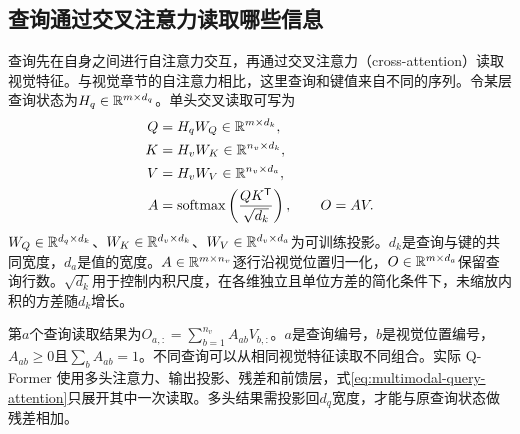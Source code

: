 \subsection{查询通过交叉注意力读取哪些信息}
查询先在自身之间进行自注意力交互，再通过交叉注意力（cross-attention）读取视觉特征。与视觉章节的自注意力相比，这里查询和键值来自不同的序列。令某层查询状态为$H_q\in\mathbb{R}^{m\times d_q}$。单头交叉读取可写为
\begin{align}
 Q&=H_qW_Q\in\mathbb{R}^{m\times d_k},\\
 K&=H_vW_K\in\mathbb{R}^{n_v\times d_k},\\
 V&=H_vW_V\in\mathbb{R}^{n_v\times d_a},\\
 A&=\operatorname{softmax}\left(\frac{QK^{\mathsf T}}{\sqrt{d_k}}\right),
 \qquad O=AV.
 \label{eq:multimodal-query-attention}
\end{align}
$W_Q\in\mathbb{R}^{d_q\times d_k}$、$W_K\in\mathbb{R}^{d_v\times d_k}$、$W_V\in\mathbb{R}^{d_v\times d_a}$为可训练投影。$d_k$是查询与键的共同宽度，$d_a$是值的宽度。$A\in\mathbb{R}^{m\times n_v}$逐行沿视觉位置归一化，$O\in\mathbb{R}^{m\times d_a}$保留查询行数。$\sqrt{d_k}$用于控制内积尺度，在各维独立且单位方差的简化条件下，未缩放内积的方差随$d_k$增长。

第$a$个查询读取结果为$O_{a,:}=\sum_{b=1}^{n_v}A_{ab}V_{b,:}$。$a$是查询编号，$b$是视觉位置编号，$A_{ab}\geq0$且$\sum_bA_{ab}=1$。不同查询可以从相同视觉特征读取不同组合。实际 Q-Former 使用多头注意力、输出投影、残差和前馈层，式\eqref{eq:multimodal-query-attention}只展开其中一次读取。多头结果需投影回$d_q$宽度，才能与原查询状态做残差相加。

